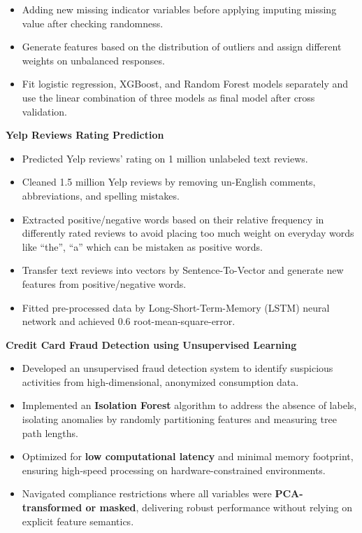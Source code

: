 \begin{cventries}
{\begin{cvitems}
\begin{itemize}
          \item Adding new missing indicator variables before applying imputing missing value after checking randomness. 
          \item Generate features based on the distribution of outliers and assign different weights on unbalanced responses.
          \item Fit logistic regression, XGBoost, and Random Forest models separately and use the linear combination of three models as final model after cross validation.
        \end{itemize}
        \item \textbf{Yelp Reviews Rating Prediction}
        \begin{itemize}
          \item Predicted Yelp reviews’ rating on 1 million unlabeled text reviews.
          \item Cleaned 1.5 million Yelp reviews by removing un-English comments, abbreviations, and spelling mistakes. 
          \item Extracted positive/negative words based on their relative frequency in differently rated reviews to avoid placing too much weight on everyday words like “the”, “a” which can be mistaken as positive words.
          \item	Transfer text reviews into vectors by Sentence-To-Vector and generate new features from positive/negative words.
          \item Fitted pre-processed data by Long-Short-Term-Memory (LSTM) neural network and achieved 0.6 root-mean-square-error.
        \end{itemize}
        \item \textbf{Credit Card Fraud Detection using Unsupervised Learning}
        \begin{itemize}
          \item Developed an unsupervised fraud detection system to identify suspicious activities from high-dimensional, anonymized consumption data.
          \item Implemented an \textbf{Isolation Forest} algorithm to address the absence of labels, isolating anomalies by randomly partitioning features and measuring tree path lengths.
          \item Optimized for \textbf{low computational latency} and minimal memory footprint, ensuring high-speed processing on hardware-constrained environments.
          \item Navigated compliance restrictions where all variables were \textbf{PCA-transformed or masked}, delivering robust performance without relying on explicit feature semantics.
        \end{itemize}
      \end{cvitems}
    }


\end{cventries}
